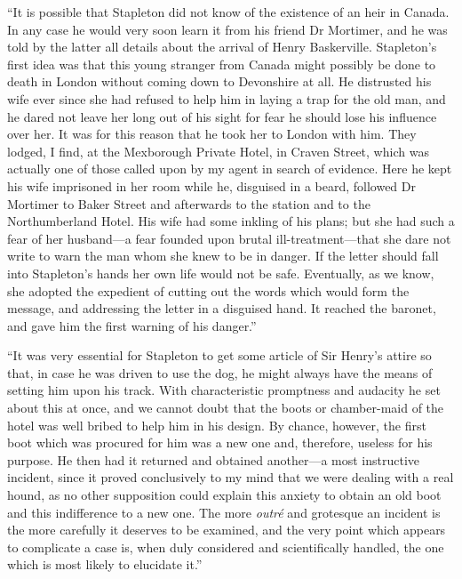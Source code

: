 \documentclass[paper=5.5in:8.5in,BCOR=7mm,twoside,DIV=calc,12pt,usegeometry,openany,chapterprefix,endperiod]{scrbook} %
\begin{document}
\enquote{It is possible that Stapleton did not know of the existence of an heir in Canada. In any case he would very soon learn it from his friend Dr Mortimer, and he was told by the latter all details about the arrival of Henry Baskerville. Stapleton's first idea was that this young stranger from Canada might possibly be done to death in London without coming down to Devonshire at all. He distrusted his wife ever since she had refused to help him in laying a trap for the old man, and he dared not leave her long out of his sight for fear he should lose his influence over her. It was for this reason that he took her to London with him. They lodged, I find, at the Mexborough Private Hotel, in Craven Street, which was actually one of those called upon by my agent in search of evidence. Here he kept his wife imprisoned in her room while he, disguised in a beard, followed Dr Mortimer to Baker Street and afterwards to the station and to the Northumberland Hotel. His wife had some inkling of his plans; but she had such a fear of her husband\nobreakdash---a fear founded upon brutal ill-treatment\nobreakdash---that she dare not write to warn the man whom she knew to be in danger. If the letter should fall into Stapleton's hands her own life would not be safe. Eventually, as we know, she adopted the expedient of cutting out the words which would form the message, and addressing the letter in a disguised hand. It reached the baronet, and gave him the first warning of his danger.}

\enquote{It was very essential for Stapleton to get some article of Sir Henry's attire so that, in case he was driven to use the dog, he might always have the means of setting him upon his track. With characteristic promptness and audacity he set about this at once, and we cannot doubt that the boots or chamber-maid of the hotel was well bribed to help him in his design. By chance, however, the first boot which was procured for him was a new one and, therefore, useless for his purpose. He then had it returned and obtained another\nobreakdash---a most instructive incident, since it proved conclusively to my mind that we were dealing with a real hound, as no other supposition could explain this anxiety to obtain an old boot and this indifference to a new one. The more \textit{outré} and grotesque an incident is the more carefully it deserves to be examined, and the very point which appears to complicate a case is, when duly considered and scientifically handled, the one which is most likely to elucidate it.}
\end{document}
